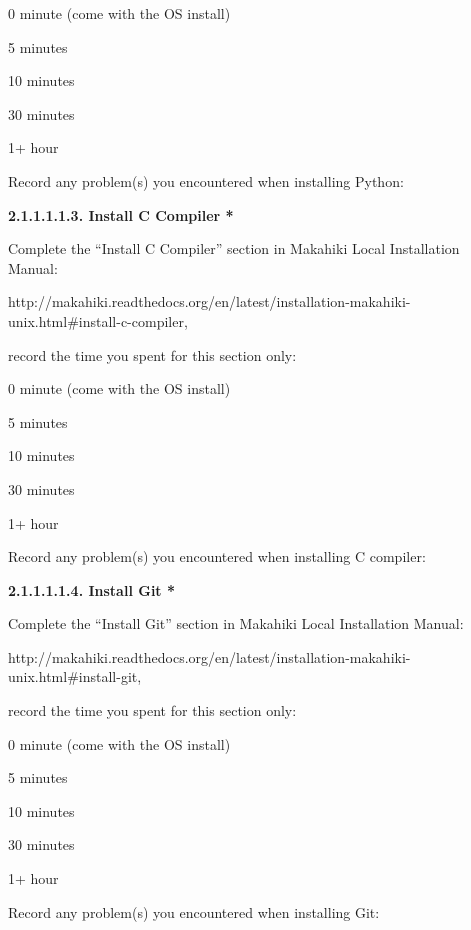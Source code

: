\begin{radiobutton}
\item 0 minute (come with the OS install)
\item 5 minutes
\item  10 minutes
\item  30 minutes
\item  1+ hour
\end{radiobutton}


Record any problem(s) you encountered when installing Python: \underline{\hspace{4cm}}

{\bf 2.1.1.1.1.3. Install C Compiler *}

Complete the ``Install C Compiler'' section in Makahiki Local Installation Manual:

http://makahiki.readthedocs.org/en/latest/installation-makahiki-unix.html\#install-c-compiler, 

record the time you spent for this section only:

\begin{radiobutton}
\item 0 minute (come with the OS install)
\item 5 minutes
\item  10 minutes
\item  30 minutes
\item  1+ hour
\end{radiobutton}

Record any problem(s) you encountered when installing C compiler: \underline{\hspace{4cm}}

{\bf 2.1.1.1.1.4. Install Git *}

Complete the ``Install Git'' section in Makahiki Local Installation Manual:

http://makahiki.readthedocs.org/en/latest/installation-makahiki-unix.html\#install-git, 

record the time you spent for this section only:

\begin{radiobutton}
\item 0 minute (come with the OS install)
\item 5 minutes
\item  10 minutes
\item  30 minutes
\item  1+ hour
\end{radiobutton}

Record any problem(s) you encountered when installing Git: \underline{\hspace{4cm}}

